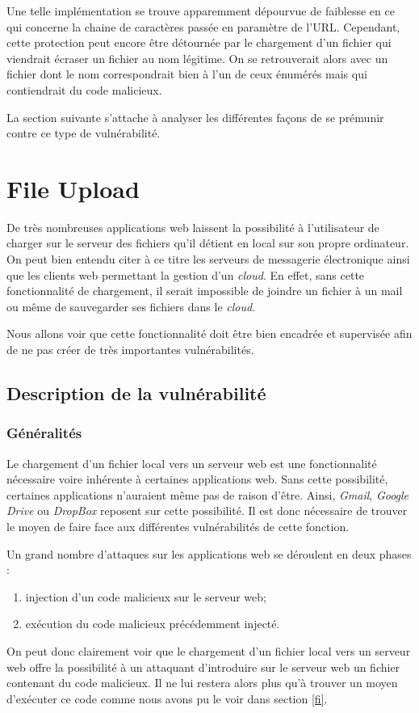 Une telle implémentation se trouve apparemment dépourvue de faiblesse en ce qui concerne la chaine de caractères passée en paramètre de l'URL. Cependant, cette protection peut encore être détournée par le chargement d'un fichier qui viendrait écraser un fichier au nom légitime. On se retrouverait alors avec un fichier dont le nom correspondrait bien à l'un de ceux énumérés mais qui contiendrait du code malicieux. 

La section suivante s'attache à analyser les différentes façons de se prémunir contre ce type de vulnérabilité.

\clearpage

\newpage

\section{File Upload}
\label{fu}

De très nombreuses applications web laissent la possibilité à l'utilisateur de charger sur le serveur des fichiers qu'il détient en local sur son propre ordinateur. On peut bien entendu citer à ce titre les serveurs de messagerie électronique ainsi que les clients web permettant la gestion d'un \textit{cloud}. En effet, sans cette fonctionnalité de chargement, il serait impossible de joindre un fichier à un mail ou même de sauvegarder ses fichiers dans le \textit{cloud}. 

Nous allons voir que cette fonctionnalité doit être bien encadrée et supervisée afin de ne pas créer de très importantes vulnérabilités.

\subsection{Description de la vulnérabilité}

\subsubsection{Généralités}

Le chargement d'un fichier local vers un serveur web est une fonctionnalité nécessaire voire inhérente à certaines applications web. Sans cette possibilité, certaines applications n'auraient même pas de raison d'être. Ainsi, \textit{Gmail}, \textit{Google Drive} ou \textit{DropBox} reposent sur cette possibilité. Il est donc nécessaire de trouver le moyen de faire face aux différentes vulnérabilités de cette fonction.

Un grand nombre d'attaques sur les applications web se déroulent en deux phases :
\begin{enumerate}
\item injection d'un code malicieux sur le serveur web;
\item exécution du code malicieux précédemment injecté.
\end{enumerate} 
On peut donc clairement voir que le chargement d'un fichier local vers un serveur web offre la possibilité à un attaquant d'introduire sur le serveur web un fichier contenant du code malicieux. Il ne lui restera alors plus qu'à trouver un moyen d'exécuter ce code comme nous avons pu le voir dans section \ref{fi}.

